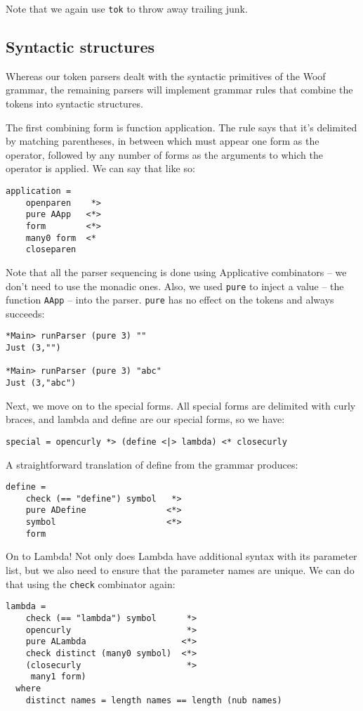 \documentclass{tmr}
\begin{document}
Note that we again use \verb+tok+ to throw away trailing junk.


\subsection{Syntactic structures}
Whereas our token parsers dealt with the syntactic primitives of the Woof grammar, 
the remaining parsers will implement grammar rules that combine the tokens
into syntactic structures.

The first combining form is function application.  The rule says that it's delimited
by matching parentheses, in between which must appear one form as the operator, followed
by any number of forms as the arguments to which the operator is applied.  We can
say that like so:
\begin{verbatim}
application =
    openparen    *>
    pure AApp   <*>
    form        <*>
    many0 form  <*
    closeparen
\end{verbatim}

Note that all the parser sequencing is done using Applicative
combinators -- we don't need to use the monadic ones.  Also, we used \verb+pure+ 
to inject a value -- the function \verb+AApp+ -- into the parser.  \verb+pure+ 
has no effect on the tokens and always succeeds:
\begin{verbatim}
*Main> runParser (pure 3) ""
Just (3,"")

*Main> runParser (pure 3) "abc"
Just (3,"abc")
\end{verbatim}

Next, we move on to the special forms.  All special forms are delimited with
curly braces, and lambda and define are our special forms, so we have:

\begin{verbatim}
special = opencurly *> (define <|> lambda) <* closecurly
\end{verbatim}

A straightforward translation of define from the grammar produces:
\begin{verbatim}
define =
    check (== "define") symbol   *>
    pure ADefine                <*>
    symbol                      <*>
    form
\end{verbatim}

On to Lambda!  Not only does Lambda have additional syntax with its parameter 
list, but we also need to ensure that the parameter names are unique.  We can 
do that using the \verb+check+ combinator again:
\begin{verbatim}
lambda = 
    check (== "lambda") symbol      *>
    opencurly                       *>
    pure ALambda                   <*>
    check distinct (many0 symbol)  <*>
    (closecurly                     *>
     many1 form)
  where
    distinct names = length names == length (nub names)
\end{verbatim}
\end{document}
